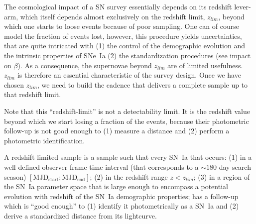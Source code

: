 \documentclass[\docopts]{\docclass}
\begin{document}
The cosmological impact of a SN survey essentially depends on its
redshift lever-arm, which itself depends almost exclusively on the
redshift limit, $z_{lim}$, beyond which one starts to loose events
because of poor sampling.
One can of course model the fraction of events lost, however, this
procedure yields uncertainties, that are quite intricated with (1) the
control of the demographic evolution and the intrinsic properties of
SNe~Ia (2) the standardization procedures (see impact on $\beta$).  As
a consequence, the supernovae beyond $z_{lim}$ are of limited
usefulness.  $z_{lim}$ is therefore an essential characteristic of the
survey design. Once we have chosen $z_{lim}$, we need to build the cadence 
that delivers a complete sample up to that redshift limit. 




Note that this ``redshift-limit''
is not a detectability limit. It is the redshift value beyond which
we start losing a fraction of the events, because their photometric
follow-up is not good enough to (1) measure a distance and (2) perform
a photometric identification.

A redshift limited sample is a sample such that every SN~Ia that occurs:
(1) in a well defined observer-frame time interval (that corresponds
  to a $\sim 180$ day search season) $\mathrm{[MJD_{start}; MJD_{end}]}$;
(2) in the redshift range $z < z_{lim}$;
(3) in a region of the SN~Ia parameter space that is large enough to
  encompass a potential evolution with redshift of the SN~Ia
  demographic properties;
has a follow-up which is ``good enough'' to (1) identify it
photometrically as a SN~Ia and (2) derive a standardized distance from
its lightcurve.
\end{document}
